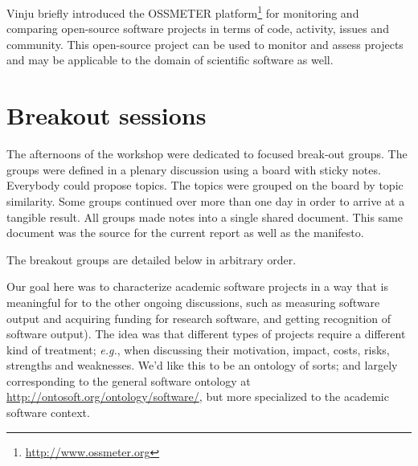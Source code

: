 \documentclass[a4paper,UKenglish]{dagrep}
\newcommand{\eg}{\emph{e.g.},\xspace}
\begin{document}

Vinju briefly introduced the OSSMETER platform\footnote{\url{http://www.ossmeter.org}} for monitoring and comparing open-source software projects in terms of code, activity, issues and community. This open-source project can be used to monitor and assess projects and may be applicable to the domain of scientific software as well.




\section{Breakout sessions}

The afternoons of the workshop were dedicated to focused break-out groups. The groups were defined in a plenary discussion using a board with sticky notes. Everybody could propose topics. The topics were grouped on the board by topic similarity. Some groups continued over more than one day in order to arrive at a tangible result. All groups made notes into a single shared document. This same document was the source for the current report as well as the manifesto.

The breakout groups are detailed below in arbitrary order.


Our goal here was to characterize academic software projects in a way that is meaningful for to the other ongoing discussions, such as measuring software output and acquiring funding for research software, and getting recognition of software output). The idea was that different types of projects require a different kind of treatment; \eg when discussing their motivation, impact, costs, risks, strengths and weaknesses. We'd like this to be an ontology of sorts; and largely corresponding to the general software ontology at \url{http://ontosoft.org/ontology/software/}, but more specialized to the academic software context.
\end{document}
